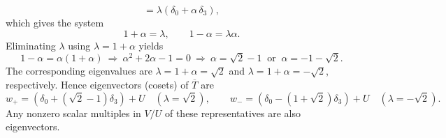 \documentclass{article}
\begin{document}
\begin{enumerate}[(a)]
\begin{enumerate}[1.]
\[            = \lambda(\delta_0+\alpha\,\delta_3),
        \]
        which gives the system
        \[
            1+\alpha=\lambda,\qquad 1-\alpha=\lambda\alpha.
        \]
        Eliminating $\lambda$ using $\lambda=1+\alpha$ yields
        \[
            1-\alpha=\alpha(1+\alpha)\ \Longrightarrow\ \alpha^2+2\alpha-1=0
            \ \Longrightarrow\ \alpha=\sqrt{2}-1\ \text{ or }\ \alpha=-1-\sqrt{2}.
        \]
        The corresponding eigenvalues are $\lambda=1+\alpha=\sqrt{2}$ and $\lambda=1+\alpha=-\sqrt{2}$, respectively. Hence eigenvectors (cosets) of $\overline{T}$ are
        \[
            w_+ = (\delta_0 + (\sqrt{2}-1)\delta_3)+U \quad (\lambda=\sqrt{2}),\qquad
            w_- = (\delta_0 - (1+\sqrt{2})\delta_3)+U \quad (\lambda=-\sqrt{2}).
        \]
        Any nonzero scalar multiples in $V/U$ of these representatives are also eigenvectors.
    \end{enumerate}
\end{enumerate}
\end{document}

